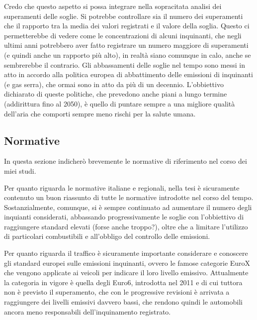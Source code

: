\documentclass{article}
\begin{document}
Credo che questo aspetto si possa integrare nella sopracitata analisi dei superamenti delle soglie. Si potrebbe controllare sia il numero dei superamenti che il rapporto tra la media dei valori registrati e il valore della soglia. Questo ci permetterebbe di vedere come le concentrazioni di alcuni inquinanti, che negli ultimi anni potrebbero aver fatto registrare un numero maggiore di superamenti (e quindi anche un rapporto più alto), in realtà siano comunque in calo, anche se sembrerebbe il contrario. Gli abbassamenti delle soglie nel tempo sono messi in atto in accordo alla politica europea di abbattimento delle emissioni di inquinanti (e gas serra), che ormai sono in atto da più di un decennio. L'obbiettivo dichiarato di queste politiche, che prevedono anche piani a lungo termine (addirittura fino al 2050), è quello di puntare sempre a una migliore qualità dell'aria che comporti sempre meno rischi per la salute umana.


\subsection{Normative}
\label{subsec:normative}
In questa sezione indicherò brevemente le normative di riferimento nel corso dei miei studi.

Per quanto riguarda le normative italiane e regionali, nella tesi\cite{scolari2017evoluzione} è sicuramente contenuto un buon riassunto di tutte le normative introdotte nel corso del tempo. Sostanzialmente, comunque, si è sempre continuato ad aumentare il numero degli inquianti considerati, abbassando progressivamente le soglie con l'obbiettivo di raggiungere standard elevati (forse anche troppo?), oltre che a limitare l'utilizzo di particolari combustibili e all'obbligo del controllo delle emissioni. 

Per quanto riguarda il traffico è sicuramente importante considerare e conoscere gli standard europei sulle emissioni inquinanti, ovvero le famose categorie EuroX che vengono applicate ai veicoli per indicare il loro livello emissivo. Attualmente la categoria in vigore è quella degli Euro6, introdotta nel 2011 e di cui tuttora non è previsto il superamento, che con le progressive revisioni è arrivata a raggiungere dei livelli emissivi davvero bassi, che rendono quindi le automobili ancora meno responsabili dell'inquinamento registrato. 
\end{document}
